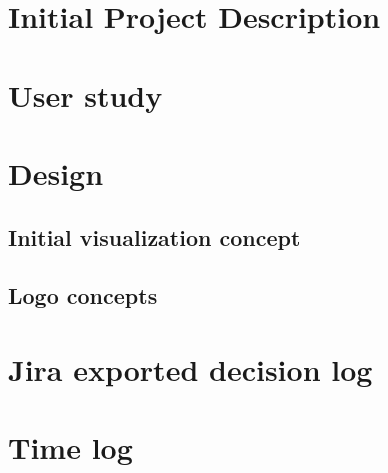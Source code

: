 \documentclass[BPROG,english,oneside]{ntnuthesis/ntnubachelorthesis}
\begin{document}

\makefrontpages %




\tableofcontents
\listoffigures
\listoftables
\lstlistoflistings
\printglossaries


















\appendix %
\chapter{Initial Project Description}   \label{appendix:initialProjectDescription}



%
\chapter{User study}
\label{app:userStudies}











\chapter{Design}
\section{Initial visualization concept}
 \label{app:initialConcept}
\section{Logo concepts}

\chapter{Jira exported decision log}    \label{appendix:decisionLog}


\chapter{Time log}
\label{app:timelog}

%
\end{document}
